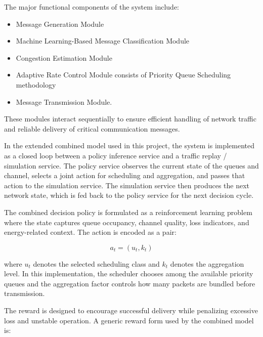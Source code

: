 The major functional components of the system include:

\begin{itemize}

\item Message Generation Module

\item Machine Learning-Based Message Classification Module

\item Congestion Estimation Module

\item Adaptive Rate Control Module consists of Priority Queue Scheduling methodology

\item Message Transmission Module.

\end{itemize}

These modules interact sequentially to ensure efficient handling 
of network traffic and reliable delivery of critical communication 
messages.

In the extended combined model used in this project, the system is 
implemented as a closed loop between a policy inference service and a 
traffic replay / simulation service. The policy service observes the 
current state of the queues and channel, selects a joint action for 
scheduling and aggregation, and passes that action to the simulation 
service. The simulation service then produces the next network state, 
which is fed back to the policy service for the next decision cycle.

The combined decision policy is formulated as a reinforcement learning 
problem where the state captures queue occupancy, channel quality, loss 
indicators, and energy-related context. The action is encoded as a pair:

\begin{equation}
a_t = (u_t, k_t)
\end{equation}

\noindent where $u_t$ denotes the selected scheduling class and $k_t$ 
denotes the aggregation level. In this implementation, the scheduler 
chooses among the available priority queues and the aggregation factor 
controls how many packets are bundled before transmission.

The reward is designed to encourage successful delivery while 
penalizing excessive loss and unstable operation. A generic reward form 
used by the combined model is:

